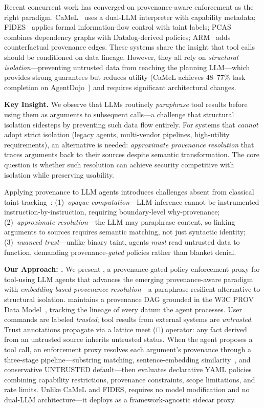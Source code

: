 Recent concurrent work has converged on provenance-aware enforcement as the right paradigm. CaMeL~\cite{camel2025} uses a dual-LLM interpreter with capability metadata; FIDES~\cite{fides2025} applies formal information-flow control with taint labels; PCAS~\cite{pcas2026} combines dependency graphs with Datalog-derived policies; ARM~\cite{arm2026} adds counterfactual provenance edges. These systems share the insight that tool calls should be conditioned on data lineage. However, they all rely on \emph{structural isolation}---preventing untrusted data from reaching the planning LLM---which provides strong guarantees but reduces utility (CaMeL achieves 48--77\% task completion on AgentDojo~\cite{opcamel2025,agentarmor2025}) and requires significant architectural changes.

\textbf{Key Insight.}
We observe that LLMs routinely \emph{paraphrase} tool results before using them as arguments to subsequent calls---a challenge that structural isolation sidesteps by preventing such data flow entirely. For systems that \emph{cannot} adopt strict isolation (legacy agents, multi-vendor pipelines, high-utility requirements), an alternative is needed: \emph{approximate provenance resolution} that traces arguments back to their sources despite semantic transformation. The core question is whether such resolution can achieve security competitive with isolation while preserving usability.

Applying provenance to LLM agents introduces challenges absent from classical taint tracking~\cite{taint-analysis-survey,taintdroid}: (1)~\emph{opaque computation}---LLM inference cannot be instrumented instruction-by-instruction, requiring boundary-level why-provenance; (2)~\emph{approximate resolution}---the LLM may paraphrase content, so linking arguments to sources requires semantic matching, not just syntactic identity; (3)~\emph{nuanced trust}---unlike binary taint, agents \emph{must} read untrusted data to function, demanding provenance-\emph{gated} policies rather than blanket denial.

\textbf{Our Approach: \sys{}.}
We present \sys{}, a provenance-gated policy enforcement proxy for tool-using LLM agents that advances the emerging provenance-aware paradigm~\cite{camel2025,fides2025,pcas2026} with \emph{embedding-based provenance resolution}---a paraphrase-resilient alternative to structural isolation. \sys{} maintains a provenance DAG grounded in the W3C PROV Data Model~\cite{prov-dm}, tracking the lineage of every datum the agent processes. User commands are labeled \emph{trusted}; tool results from external systems are \emph{untrusted}. Trust annotations propagate via a lattice meet ($\sqcap$) operator: any fact derived from an untrusted source inherits untrusted status. When the agent proposes a tool call, an enforcement proxy resolves each argument's provenance through a three-stage pipeline---substring matching, sentence-embedding similarity~\cite{dipper2023}, and conservative UNTRUSTED default---then evaluates declarative YAML policies combining capability restrictions, provenance constraints, scope limitations, and rate limits. Unlike CaMeL and FIDES, \sys{} requires no model modification and no dual-LLM architecture---it deploys as a framework-agnostic sidecar proxy.

